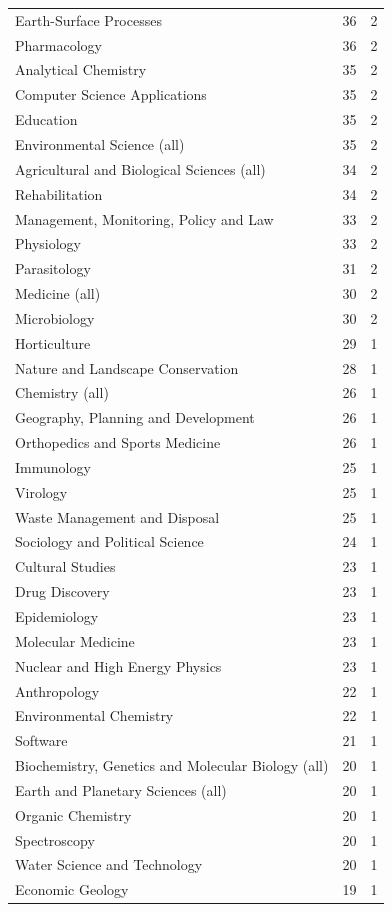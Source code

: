 \documentclass[12pt,brazil]{article}\usepackage[]{graphicx}\usepackage[]{xcolor}
\begin{document}
\begin{longtable}{lrr}
Earth-Surface Processes & 36 & 2 \\
Pharmacology & 36 & 2 \\
Analytical Chemistry & 35 & 2 \\
Computer Science Applications & 35 & 2 \\
Education & 35 & 2 \\
Environmental Science (all) & 35 & 2 \\
Agricultural and Biological Sciences (all) & 34 & 2 \\
Rehabilitation & 34 & 2 \\
Management, Monitoring, Policy and Law & 33 & 2 \\
Physiology & 33 & 2 \\
Parasitology & 31 & 2 \\
Medicine (all) & 30 & 2 \\
Microbiology & 30 & 2 \\
Horticulture & 29 & 1 \\
Nature and Landscape Conservation & 28 & 1 \\
Chemistry (all) & 26 & 1 \\
Geography, Planning and Development & 26 & 1 \\
Orthopedics and Sports Medicine & 26 & 1 \\
Immunology & 25 & 1 \\
Virology & 25 & 1 \\
Waste Management and Disposal & 25 & 1 \\
Sociology and Political Science & 24 & 1 \\
Cultural Studies & 23 & 1 \\
Drug Discovery & 23 & 1 \\
Epidemiology & 23 & 1 \\
Molecular Medicine & 23 & 1 \\
Nuclear and High Energy Physics & 23 & 1 \\
Anthropology & 22 & 1 \\
Environmental Chemistry & 22 & 1 \\
Software & 21 & 1 \\
Biochemistry, Genetics and Molecular Biology (all) & 20 & 1 \\
Earth and Planetary Sciences (all) & 20 & 1 \\
Organic Chemistry & 20 & 1 \\
Spectroscopy & 20 & 1 \\
Water Science and Technology & 20 & 1 \\
Economic Geology & 19 & 1 \\

\end{longtable}
\end{document}
